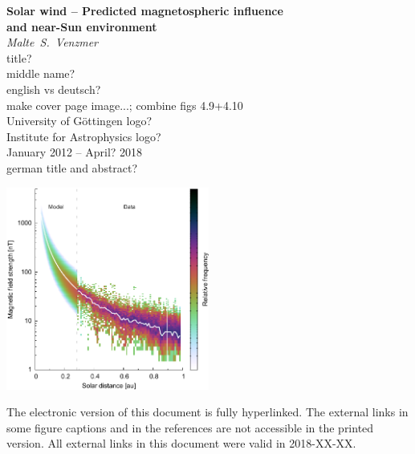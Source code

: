 
\begin{titlepage}
	\begin{center}
		{\LARGE\sffamily
			\textbf{Solar wind -- Predicted magnetospheric influence\\and near-Sun environment}\\
		}
		\Large
		\textit{Malte~S.~Venzmer}\\
		title?\\
		middle name?\\
		english vs deutsch?\\
		make cover page image...; combine figs 4.9+4.10\\
		University of Göttingen logo?\\
		Institute for Astrophysics logo?\\
		January 2012 -- April? 2018\\
		german title and abstract?\\
	\end{center}
\end{titlepage}



	\includegraphics[width=0.5\textwidth]{figures_of_mine/gnuplots/fit_fixed_B_paper_f_title.pdf}
% 


\begin{small}
	\noindent The electronic version of this document is fully hyperlinked. The external links in some figure captions and in the references are not accessible in the printed version. All external links in this document were valid in 2018-XX-XX.
\end{small}

